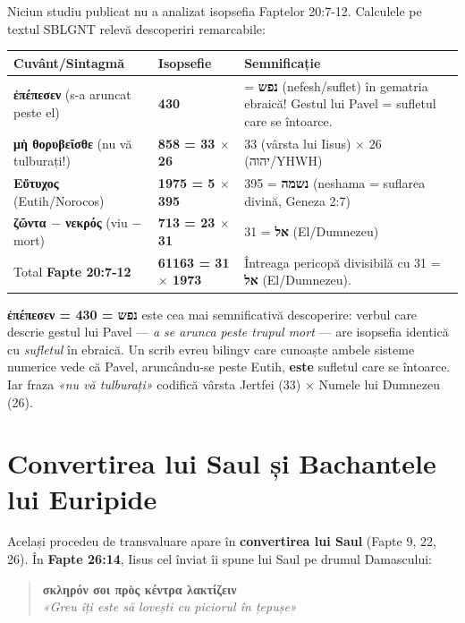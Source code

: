 \documentclass[12pt,a4paper,twoside,openany]{book}
\begin{document}
Niciun studiu publicat nu a analizat isopsefia Faptelor 20:7-12. Calculele pe textul SBLGNT relevă descoperiri remarcabile:

\begin{center}
\small
\begin{tabular}{L{4cm}C{2.5cm}L{6.5cm}}
\toprule
{}
\textbf{Cuvânt/Sintagmă} & \textbf{Isopsefie} & \textbf{Semnificație} \\
\midrule
\textbf{ἐπέπεσεν} (s-a aruncat peste el) & \textbf{\textcolor{primary}{430}} & = \textbf{נפש} (nefesh/suflet) în gematria ebraică! Gestul lui Pavel = sufletul care se întoarce. \\
\textbf{μὴ θορυβεῖσθε} (nu vă tulburați!) & \textbf{\textcolor{primary}{858 = 33 $\times$ 26}} & 33 (vârsta lui Iisus) $\times$ 26 (יהוה/YHWH) \\
\textbf{Εὔτυχος} (Eutih/Norocos) & \textbf{\textcolor{primary}{1975 = 5 $\times$ 395}} & 395 = \textbf{נשמה} (neshama = suflarea divină, Geneza 2:7) \\
\textbf{ζῶντα $-$ νεκρός} (viu $-$ mort) & \textbf{\textcolor{primary}{713 = 23 $\times$ 31}} & 31 = \textbf{אל} (El/Dumnezeu) \\
Total \textbf{Fapte 20:7-12} & \textbf{\textcolor{primary}{61163 = 31 $\times$ 1973}} & Întreaga pericopă divisibilă cu 31 = \textbf{אל} (El/Dumnezeu). \\
\bottomrule
\end{tabular}
\end{center}
\normalsize

\textbf{\textcolor{primary}{ἐπέπεσεν = נפש = 430}} este cea mai semnificativă descoperire: verbul care descrie gestul lui Pavel --- \textit{a se arunca peste trupul mort} --- are isopsefia identică cu \textit{sufletul} în ebraică. Un scrib evreu bilingv care cunoaște ambele sisteme numerice vede că Pavel, aruncându-se peste Eutih, \textbf{este} sufletul care se întoarce. Iar fraza \textit{«nu vă tulburați»} codifică vârsta Jertfei (33) $\times$ Numele lui Dumnezeu (26).


\section{Convertirea lui Saul și Bachantele lui Euripide}

Același procedeu de transvaluare apare în \textbf{convertirea lui Saul} (Fapte 9, 22, 26). În \textbf{Fapte 26:14}, Iisus cel înviat îi spune lui Saul pe drumul Damascului:

\begin{quote}
\textbf{σκληρόν σοι πρὸς κέντρα λακτίζειν}\\
\textit{«Greu îți este să lovești cu piciorul în țepușe»}
\end{quote}
\end{document}
